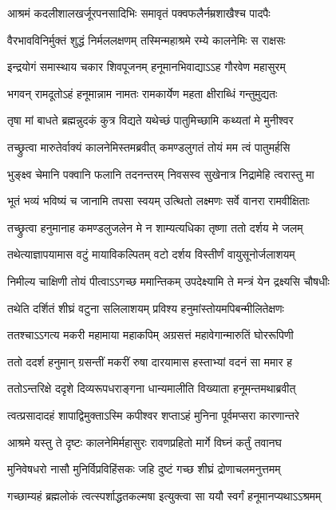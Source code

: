 \twolineshloka
{आश्रमं कदलीशालखर्जूरपनसादिभिः}
{समावृतं पक्वफलैर्नम्रशाखैश्च पादपैः} %

\twolineshloka
{वैरभावविनिर्मुक्तं शुद्धं निर्मललक्षणम्}
{तस्मिन्महाश्रमे रम्ये कालनेमिः स राक्षसः} %

\twolineshloka
{इन्द्रयोगं समास्थाय चकार शिवपूजनम्}
{हनूमानभिवाद्याऽऽह गौरवेण महासुरम्} %

\twolineshloka
{भगवन् रामदूतोऽहं हनूमान्नाम नामतः}
{रामकार्येण महता क्षीराब्धिं गन्तुमुद्यतः} %

\twolineshloka
{तृषा मां बाधते ब्रह्मन्नुदकं कुत्र विद्यते}
{यथेच्छं पातुमिच्छामि कथ्यतां मे मुनीश्वर} %

\twolineshloka
{तच्छ्रुत्वा मारुतेर्वाक्यं कालनेमिस्तमब्रवीत्}
{कमण्डलुगतं तोयं मम त्वं पातुमर्हसि} %

\twolineshloka
{भुङ्क्ष्व चेमानि पक्वानि फलानि तदनन्तरम्}
{निवसस्व सुखेनात्र निद्रामेहि त्वरास्तु मा} %

\twolineshloka
{भूतं भव्यं भविष्यं च जानामि तपसा स्वयम्}
{उत्थितो लक्ष्मणः सर्वे वानरा रामवीक्षिताः} %

\twolineshloka
{तच्छ्रुत्वा हनुमानाह कमण्डलुजलेन मे}
{न शाम्यत्यधिका तृष्णा ततो दर्शय मे जलम्} %

\twolineshloka
{तथेत्याज्ञापयामास वटुं मायाविकल्पितम्}
{वटो दर्शय विस्तीर्णं वायुसूनोर्जलाशयम्} %

\twolineshloka
{निमील्य चाक्षिणी तोयं पीत्वाऽऽगच्छ ममान्तिकम्}
{उपदेक्ष्यामि ते मन्त्रं येन द्रक्ष्यसि चौषधीः} %

\twolineshloka
{तथेति दर्शितं शीघ्रं वटुना सलिलाशयम्}
{प्रविश्य हनुमांस्तोयमपिबन्मीलितेक्षणः} %

\twolineshloka
{ततश्चाऽऽगत्य मकरी महामाया महाकपिम्}
{अग्रसत्तं महावेगान्मारुतिं घोररूपिणी} %

\twolineshloka
{ततो ददर्श हनुमान् ग्रसन्तीं मकरीं रुषा}
{दारयामास हस्ताभ्यां वदनं सा ममार ह} %

\twolineshloka
{ततोऽन्तरिक्षे ददृशे दिव्यरूपधराङ्गना}
{धान्यमालीति विख्याता हनूमन्तमथाब्रवीत्} %

\twolineshloka
{त्वत्प्रसादादहं शापाद्विमुक्ताऽस्मि कपीश्वर}
{शप्ताऽहं मुनिना पूर्वमप्सरा कारणान्तरे} %

\twolineshloka
{आश्रमे यस्तु ते दृष्टः कालनेमिर्महासुरः}
{रावणप्रहितो मार्गे विघ्नं कर्तुं तवानघ} %

\twolineshloka
{मुनिवेषधरो नासौ मुनिर्विप्रविहिंसकः}
{जहि दुष्टं गच्छ शीघ्रं द्रोणाचलमनुत्तमम्} %

\twolineshloka
{गच्छाम्यहं ब्रह्मलोकं त्वत्स्पर्शाद्धतकल्मषा}
{इत्युक्त्वा सा ययौ स्वर्गं हनूमानप्यथाऽऽश्रमम्} %

